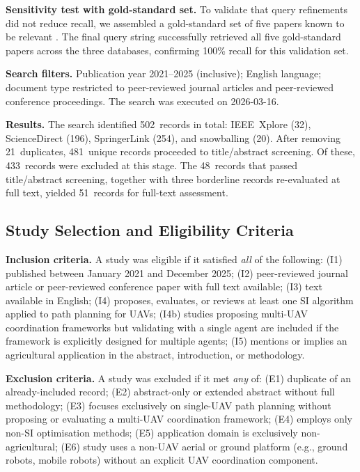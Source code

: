 \documentclass[review,3p]{elsarticle}
\begin{document}
\textbf{Sensitivity test with gold-standard set.} To validate that query
refinements did not reduce recall, we assembled a gold-standard set of five
papers known to be relevant \cite{phung2021,shafiq2022,liu2021,pan2022,puente2022}.
The final query string successfully retrieved all five gold-standard papers across
the three databases, confirming 100\% recall for this validation set.

\textbf{Search filters.} Publication year 2021--2025 (inclusive); English
language; document type restricted to peer-reviewed journal articles and
peer-reviewed conference proceedings. The search was executed on 2026-03-16.

\textbf{Results.} The search identified 502~records in total: IEEE~Xplore (32),
ScienceDirect (196), SpringerLink (254), and snowballing (20). After removing
21~duplicates, 481~unique records proceeded to title/abstract screening.
Of these, 433~records were excluded at this stage. The 48~records that passed
title/abstract screening, together with three borderline records re-evaluated
at full text, yielded 51~records for full-text assessment.

\subsection{Study Selection and Eligibility Criteria}

\textbf{Inclusion criteria.} A study was eligible if it satisfied \textit{all}
of the following: (I1) published between January 2021 and December 2025;
(I2) peer-reviewed journal article or peer-reviewed conference paper with full
text available; (I3) text available in English; (I4) proposes, evaluates, or
reviews at least one SI algorithm applied to path planning for UAVs;
(I4b) studies proposing multi-UAV coordination frameworks but validating with
a single agent are included if the framework is explicitly designed for multiple
agents; (I5) mentions or implies an agricultural application in the abstract,
introduction, or methodology.

\textbf{Exclusion criteria.} A study was excluded if it met \textit{any} of:
(E1) duplicate of an already-included record; (E2) abstract-only or extended
abstract without full methodology; (E3) focuses exclusively on single-UAV path
planning without proposing or evaluating a multi-UAV coordination framework;
(E4) employs only non-SI optimisation methods; (E5) application domain is
exclusively non-agricultural; (E6) study uses a non-UAV aerial or ground
platform (e.g., ground robots, mobile robots) without an explicit UAV
coordination component.
\end{document}
